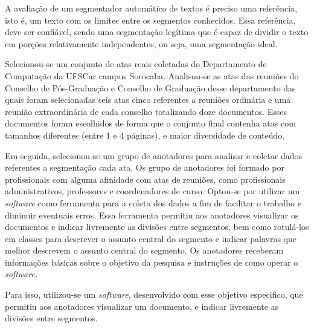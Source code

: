 


A avaliação de um segmentador automático de textos é preciso uma referência, isto é, um texto com os limites entre os segmentos conhecidos. Essa referência, deve ser confiável, sendo uma segmentação legítima que é capaz de dividir o texto em porções relativamente independentes, ou seja, uma segmentação ideal.


Selecionou-se um conjunto de atas reais coletadas do Departamento de Computação da UFSCar campus Sorocaba. Analisou-se as atas das reuniões do Conselho de Pós-Graduação e Conselho de Graduação desse departamento das quais foram selecionadas seis atas cinco referentes a reuniões ordinária e uma reunião extraordinária de cada conselho totalizando doze documentos. Esses documentos foram escolhidos de forma que o conjunto final contenha atas com tamanhos diferentes (entre 1 e 4 páginas), e maior diversidade de conteúdo.

Em seguida, selecionou-se um grupo de anotadores para analisar e coletar dados referentes a segmentação cada ata. 
Os grupo de anotadores foi formado por profissionais com alguma afinidade com atas de reuniões, como profissionais administrativos, professores e coordenadores de curso. 
Optou-se por utilizar um \textit{software} como ferramenta para a coleta dos dados a fim de facilitar o trabalho e diminuir eventuais erros. Essa ferramenta permitiu aos anotadores visualizar os documentos e indicar livremente as divisões entre segmentos, bem como rotulá-los em classes para descrever o assunto central do segmento e indicar palavras que melhor descrevem o assunto central do segmento.
Os anotadores receberam informações básicas sobre o objetivo da pesquisa e instruções de como operar o \textit{software}.

Para isso, utilizou-se um \textit{software}, desenvolvido com esse objetivo especifico, que permitiu aos anotadores visualizar um documento, e indicar livremente as divisões entre segmentos. 




